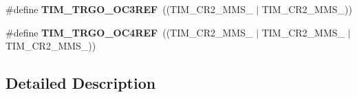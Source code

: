 \begin{DoxyCompactItemize}
\item 
\mbox{\label{group___t_i_m___master___mode___selection_ga4bc4791f8b9560950d30078b96d08f55}} 
\#define {\bfseries T\+I\+M\+\_\+\+T\+R\+G\+O\+\_\+\+O\+C3\+R\+EF}~((T\+I\+M\+\_\+\+C\+R2\+\_\+\+M\+M\+S\+\_ $\vert$ T\+I\+M\+\_\+\+C\+R2\+\_\+\+M\+M\+S\+\_))
\item 
\mbox{\label{group___t_i_m___master___mode___selection_ga7fe6228adec5d1b6f0a8ed8da111db4d}} 
\#define {\bfseries T\+I\+M\+\_\+\+T\+R\+G\+O\+\_\+\+O\+C4\+R\+EF}~((T\+I\+M\+\_\+\+C\+R2\+\_\+\+M\+M\+S\+\_ $\vert$ T\+I\+M\+\_\+\+C\+R2\+\_\+\+M\+M\+S\+\_ $\vert$ T\+I\+M\+\_\+\+C\+R2\+\_\+\+M\+M\+S\+\_))
\end{DoxyCompactItemize}


\subsection{Detailed Description}
